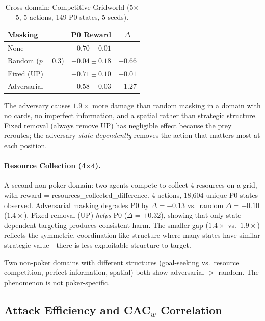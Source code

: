 \documentclass{article}
\begin{document}
\begin{table}[ht]
\centering
\caption{Cross-domain: Competitive Gridworld (5$\times$5, 5 actions, 149 P0 states, 5 seeds).}
\label{tab:gridworld}
\begin{tabular}{lcc}
\toprule
Masking & P0 Reward & $\Delta$ \\
\midrule
None & $+0.70 \pm 0.01$ & --- \\
Random ($p{=}0.3$) & $+0.04 \pm 0.18$ & $-0.66$ \\
Fixed (UP) & $+0.71 \pm 0.10$ & $+0.01$ \\
Adversarial & $\mathbf{-0.58 \pm 0.03}$ & $\mathbf{-1.27}$ \\
\bottomrule
\end{tabular}
\end{table}

The adversary causes $1.9\times$ more damage than random masking in a domain with no cards, no imperfect information, and a spatial rather than strategic structure. Fixed removal (always remove UP) has negligible effect because the prey reroutes; the adversary \emph{state-dependently} removes the action that matters most at each position.

\paragraph{Resource Collection (4$\times$4).}
A second non-poker domain: two agents compete to collect 4 resources on a grid, with reward = resources\_collected\_difference. 4 actions, 18,604 unique P0 states observed. Adversarial masking degrades P0 by $\Delta = -0.13$ vs.\ random $\Delta = -0.10$ ($1.4\times$). Fixed removal (UP) \emph{helps} P0 ($\Delta = +0.32$), showing that only state-dependent targeting produces consistent harm. The smaller gap ($1.4\times$ vs.\ $1.9\times$) reflects the symmetric, coordination-like structure where many states have similar strategic value---there is less exploitable structure to target.

Two non-poker domains with different structures (goal-seeking vs.\ resource competition, perfect information, spatial) both show adversarial $>$ random. The phenomenon is not poker-specific.

\subsection{Attack Efficiency and CAC$_w$ Correlation}
\label{sec:efficiency}
\end{document}
